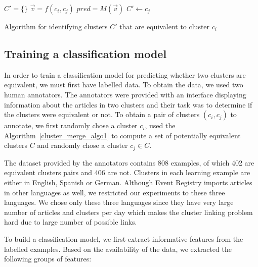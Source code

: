 \documentclass[twoside,11pt]{article}
\begin{document}
\begin{algorithm}[tb!]

$C' = \{\}$\;
 {
    $\vec{v} = f(c_i, c_j)$\;
    $pred = M(\vec{v})$\;
     {
        $C' \leftarrow c_j$
    }
}
\caption{Algorithm for identifying clusters $C'$ that are equivalent to cluster $c_i$}
\label{cluster_merge_algo2}
\end{algorithm}

\subsection{Training a classification model}
\label{trainClassifier}

In order to train a classification model for predicting whether two clusters are equivalent, we must first have labelled data. To obtain the data, we used two human annotators. The annotators were provided with an interface displaying information about the articles in two clusters and their task was to determine if the clusters were equivalent or not. To obtain a pair of clusters $(c_i, c_j)$ to annotate, we first randomly chose a cluster $c_i$, used the Algorithm~\ref{cluster_merge_algo1} to compute a set of potentially equivalent clusters $C$ and randomly chose a cluster $c_j \in C$.

The dataset provided by the annotators contains 808 examples, of which 402 are equivalent clusters pairs and 406 are not. Clusters in each learning example are either in English, Spanish or German. Although Event Registry imports articles in other languages as well, we restricted our experiments to these three languages. We chose only these three languages since they have very large number of articles and clusters per day which makes the cluster linking problem hard due to large number of possible links.

To build a classification model, we first extract  informative features from the labelled examples. Based on the availability of the data, we extracted the following groups of features:
\end{document}
